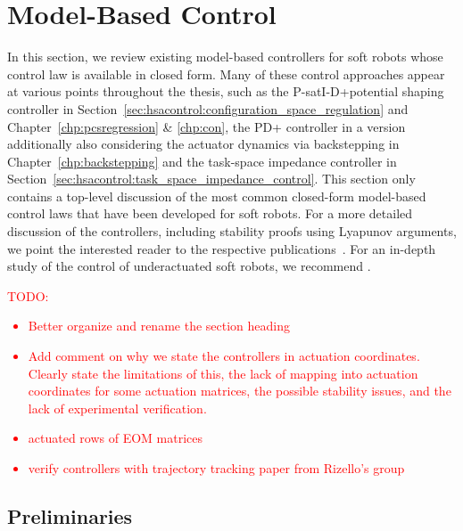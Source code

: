 \section{Model-Based Control}\label{sec:background:model_based_control}
In this section, we review existing model-based controllers for soft robots whose control law is available in closed form.
Many of these control approaches appear at various points throughout the thesis, such as the P-satI-D+potential shaping controller in Section~\ref{sec:hsacontrol:configuration_space_regulation} and Chapter~\ref{chp:pcsregression} \& \ref{chp:con}, the PD+ controller in a version additionally also considering the actuator dynamics via backstepping in Chapter~\ref{chp:backstepping} and the task-space impedance controller in Section~\ref{sec:hsacontrol:task_space_impedance_control}.
This section only contains a top-level discussion of the most common closed-form model-based control laws that have been developed for soft robots. For a more detailed discussion of the controllers, including stability proofs using Lyapunov arguments, we point the interested reader to the respective publications~\citep{della2020model, pustina2022feedback, pustina2022p, borja2022energy, della2023model}. For an in-depth study of the control of underactuated soft robots, we recommend \citet{pustina2025analysis}.

\textcolor{red}{TODO: \begin{itemize}
    \item Better organize and rename the section heading
    \item Add comment on why we state the controllers in actuation coordinates. Clearly state the limitations of this, the lack of mapping into actuation coordinates for some actuation matrices, the possible stability issues, and the lack of experimental verification.
    \item actuated rows of EOM matrices
    \item verify controllers with trajectory tracking paper from Rizello's group
\end{itemize}}

\subsection{Preliminaries}

